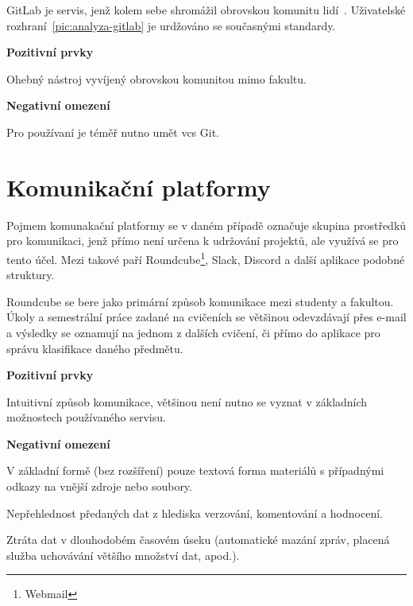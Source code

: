 GitLab je servis, jenž kolem sebe shromážil obrovskou komunitu lidí~\cite{gitlabSource}. Uživatelské rozhraní~\ref{pic:analyza-gitlab} je urdžováno se současnými standardy.

\textbf{Pozitivní prvky}

\begin{ul}
\tightlist
   \item
   Ohebný nástroj vyvíjený obrovskou komunitou mimo fakultu.
\end{ul}

\textbf{Negativní omezení}

\begin{ul}
   \item
   Pro používaní je téměř nutno umět \gls{vcs} Git.
\end{ul}




\section{Komunikační platformy}

Pojmem komunakační platformy se v daném případě označuje skupina prostředků pro komunikaci, jenž přímo není určena k udržování projektů, ale využívá se pro tento účel. Mezi takové paří Roundcube\footnote{Webmail}, Slack, Discord a další aplikace podobné struktury.

Roundcube se bere jako primární způsob komunikace mezi studenty a fakultou. Úkoly a semestrální práce zadané na cvičeních se většinou odevzdávají přes e-mail a výsledky se oznamují na jednom z dalších cvičení, či přímo do aplikace pro správu klasifikace daného předmětu.

\textbf{Pozitivní prvky}

\begin{ul}
   \item
   Intuitivní způsob komunikace, většinou není nutno se vyznat v základních možnostech používaného servisu.
\end{ul}

\textbf{Negativní omezení}

\begin{ul}
   \item
   V základní formě (bez rozšíření) pouze textová forma materiálů s případnými odkazy na vnější zdroje nebo soubory.
   \item
   Nepřehlednost předaných dat z hlediska verzování, komentování a hodnocení.
   \item
   Ztráta dat v dlouhodobém časovém úseku (automatické mazání zpráv, placená služba uchovávání většího množství dat, apod.).
\end{ul}




